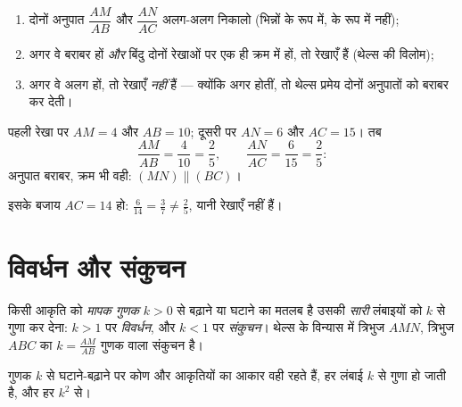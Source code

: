 \begin{method}\label{met:g9:thales:converse}
\begin{enumerate}
  \item दोनों अनुपात $\dfrac{AM}{AB}$ और $\dfrac{AN}{AC}$ अलग-अलग
        निकालो (भिन्नों के रूप में,  के रूप में नहीं);
  \item अगर वे बराबर हों \emph{और} बिंदु दोनों रेखाओं पर एक ही क्रम
        में हों, तो रेखाएँ  हैं (थेल्स की विलोम);
  \item अगर वे अलग हों, तो रेखाएँ  \emph{नहीं} हैं --- क्योंकि
        अगर होतीं, तो थेल्स प्रमेय दोनों अनुपातों को बराबर कर देती।
\end{enumerate}
\end{method}

\begin{example}\label{ex:g9:thales:converse}
पहली रेखा पर $AM = 4$ और $AB = 10$; दूसरी पर $AN = 6$ और $AC = 15$।
तब
\[
\frac{AM}{AB} = \frac{4}{10} = \frac25,
\qquad
\frac{AN}{AC} = \frac{6}{15} = \frac25 :
\]
अनुपात बराबर, क्रम भी वही: $(MN) \parallel (BC)$।

इसके बजाय $AC = 14$ हो: $\frac{6}{14} = \frac37 \neq \frac25$, यानी
रेखाएँ  नहीं हैं।
\end{example}

\section{विवर्धन और संकुचन}

\begin{definition}[आकृति को घटाना-बढ़ाना]\label{def:g9:thales:scaling}
किसी आकृति को \emph{मापक गुणक} $k > 0$ से बढ़ाने या
घटाने का मतलब है उसकी \emph{सारी} लंबाइयों को $k$ से गुणा कर देना:
$k > 1$ पर \emph{विवर्धन}, और $k < 1$ पर \emph{संकुचन}। थेल्स के
विन्यास में त्रिभुज $AMN$, त्रिभुज $ABC$ का $k = \frac{AM}{AB}$ गुणक
वाला संकुचन है।
\end{definition}

\begin{proposition}\label{prop:g9:thales:scaling}
गुणक $k$ से घटाने-बढ़ाने पर कोण और आकृतियों का आकार वही रहते हैं, हर
लंबाई $k$ से गुणा हो जाती है, और हर \emph{} $k^2$ से।
\end{proposition}
\admitted

